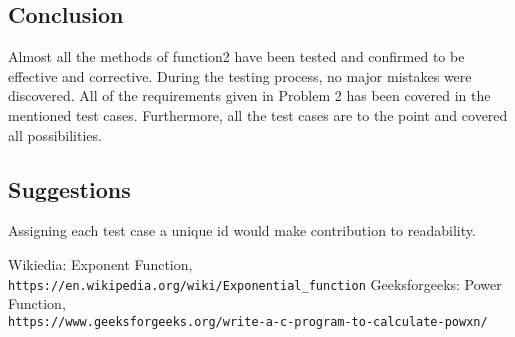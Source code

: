 \documentclass[a4paper,12pt]{article}
\begin{document}
    \subsection{Conclusion}
        Almost all the methods of function2 have been tested and confirmed to be effective and corrective. During the testing process, no major  mistakes were discovered. All of the requirements given in Problem 2 has been covered in the mentioned test cases. Furthermore, all the test cases are to the point and covered all possibilities.
        
    \subsection{Suggestions}
        Assigning each test case a unique id would make contribution to readability.
        
        
\begin{thebibliography}{}
    Wikiedia: Exponent Function,
    \\\texttt{https://en.wikipedia.org/wiki/Exponential\_function}
    Geeksforgeeks: Power Function,
    \\\texttt{https://www.geeksforgeeks.org/write-a-c-program-to-calculate-powxn/}
    \end{thebibliography}
\end{document}
